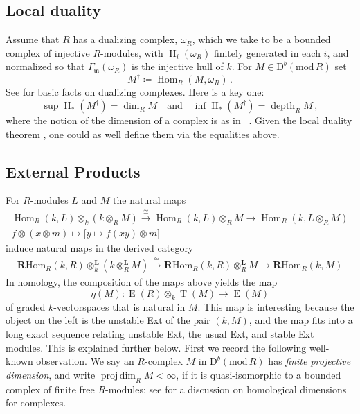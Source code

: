 \documentclass{amsart}
\numberwithin{equation}{section}
\theoremstyle{plain}
\theoremstyle{definition}
\theoremstyle{remark}
\newcommand{\dbcat}[1]{\mathrm{D}^b(\mathrm{mod}\,{#1})}
\newcommand{\depth}{\operatorname{depth}}
\newcommand{\eee}{\operatorname{E}}
\newcommand{\hh}{\operatorname{H}}
\newcommand{\Hom}{\operatorname{Hom}}
\newcommand{\lotimes}{\otimes^{\mathbf L}}
\newcommand{\projdim}{\operatorname{proj\,dim}}
\newcommand{\rhom}{\mathbf{R}\mathrm{Hom}}
\newcommand{\tee}{\operatorname{T}}
\newcommand{\fm}{\mathfrak{m}}
\begin{document}
\subsection*{Local duality}
Assume that $R$ has a dualizing complex, $\omega_R$, which we take to be a bounded  complex of injective $R$-modules, with $\hh_i(\omega_R)$ finitely generated in each $i$, and normalized so that $\varGamma_{\fm}(\omega_R)$ is the injective hull of $k$. For $M\in \dbcat R$ set
   \[
   M^\dagger \coloneqq \Hom_R(M,\omega_R)\,.
   \]
See \cite[\href{https://stacks.math.columbia.edu/tag/0A7M}{Section 0A7M}]{stacks-project} for basic facts on dualizing complexes. Here is a key one:
\begin{equation}
\label{eq:depth-dim}
\sup \hh_*(M^\dagger) = \dim_RM \quad \text{and}\quad \inf \hh_*(M^\dagger) = \depth_RM\,,    
\end{equation}
where the notion of the dimension  of a complex is as in ~\cite{Foxby:1979a}.  Given the local duality theorem \cite[\href{https://stacks.math.columbia.edu/tag/0A81}{Section 0A81}]{stacks-project}, one could as well define them via  the equalities above.

\subsection*{External Products}
For $R$-modules $L$ and $M$ the natural maps
\[
\begin{gathered}
   \Hom_R(k,L)\otimes_k(k\otimes_RM)\xrightarrow{\ \cong\ }\Hom_R(k,L)\otimes_RM \longrightarrow \Hom_R(k,L\otimes_RM) \\
   f \otimes (x\otimes m) \mapsto \big[y\mapsto f(xy)\otimes m\big]
   \end{gathered}
\]
induce natural  maps in the derived category
\begin{equation*}
\begin{gathered}
       \rhom_R(k,R)\lotimes_k(k\lotimes_RM)\xrightarrow{\ \cong\ }\rhom_R(k,R)\lotimes_RM \longrightarrow \rhom_R(k,M) 
   \end{gathered}
\end{equation*}
In homology, the composition of the maps above yields  the  map
\begin{equation}
\label{eq:eta-defn}
\eta(M) \colon \eee(R)\otimes_k \tee(M)\longrightarrow \eee(M)
\end{equation}
 of graded $k$-vectorspaces that is natural in $M$. This map is interesting because the object on the left is the unstable Ext of the pair $(k,M)$, and the map fits into a long exact sequence relating unstable Ext, the usual Ext, and stable Ext modules. This is explained further below. First we record the following well-known observation. We say an $R$-complex $M$ in $\dbcat R$ has \emph{finite projective dimension}, and write $\projdim_RM<\infty$, if it is quasi-isomorphic to a bounded complex of finite free $R$-modules; see \cite{Avramov/Foxby:1991a} for a discussion on homological dimensions for complexes.
 
\end{document}
